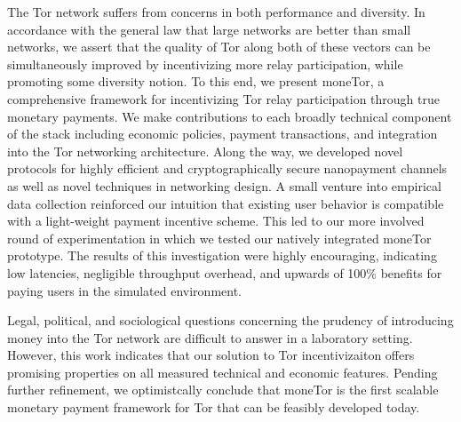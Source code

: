 The Tor network suffers from concerns in both performance and diversity. In
accordance with the general law that large networks are better than small
networks, we assert that the quality of Tor along both of these vectors can be
simultaneously improved by incentivizing more relay participation, while
promoting some diversity notion. To this end, we present moneTor, a
comprehensive framework for incentivizing Tor relay participation through true
monetary payments. We make contributions to each broadly technical component of
the stack including economic policies, payment transactions, and integration
into the Tor networking architecture. Along the way, we developed novel
protocols for highly efficient and cryptographically secure nanopayment channels
as well as novel techniques in networking design. A small venture into
empirical data collection reinforced our intuition that existing user behavior
is compatible with a light-weight payment incentive scheme. This led to our more
involved round of experimentation in which we tested our natively integrated
moneTor prototype. The results of this investigation were highly encouraging,
indicating low latencies, negligible throughput overhead, and upwards of 100\%
benefits for paying users in the simulated environment.

Legal, political, and sociological questions concerning the prudency of
introducing money into the Tor network are difficult to answer in a laboratory
setting. However, this work indicates that our solution to Tor incentivizaiton
offers promising properties on all measured technical and economic
features. Pending further refinement, we optimistcally conclude that moneTor is
the first scalable monetary payment framework for Tor that can be feasibly
developed today.

